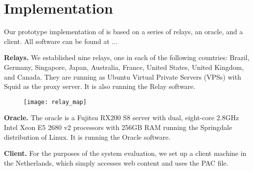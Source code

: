 \section{Implementation}
Our prototype implementation of \system{} is based on a series of relays, an oracle, and 
a client. All \system{} software can be found at ... 

{\bf Relays.}  We established nine relays, one in each of the following countries: Brazil, 
Germany, Singapore, Japan, Australia, France, United States, United Kingdom, and Canada.  
They are running as Ubuntu Virtual Private Servers (VPSs) with 
Squid as the proxy server.  It is also running the \system{} Relay software.

\begin{figure}[b!]
\centering
\texttt{[image: relay\_map]}
\caption{}
\label{fig:relay_locations}
\end{figure}

{\bf Oracle.}  The oracle is a Fujitsu RX200 S8 server with dual, 
eight-core 2.8GHz Intel Xeon E5 2680 v2 processors with 256GB RAM running the 
Springdale distribution of Linux. It is running the \system{} Oracle software.

{\bf Client.} For the purposes of the system evaluation, we set up a client 
machine in the Netherlands, which simply accesses web content and uses the PAC 
file.


